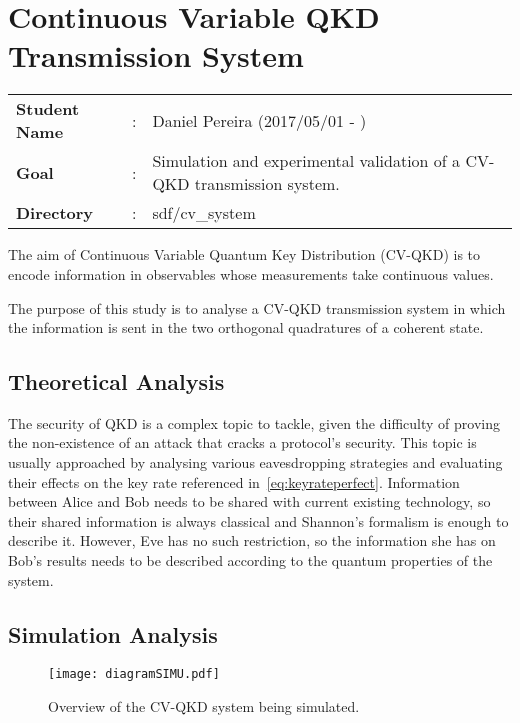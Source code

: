 \clearpage
\section{Continuous Variable QKD Transmission System}\label{sec:intro}

\begin{tcolorbox}	
\begin{tabular}{p{2.75cm} p{0.2cm} p{10.5cm}} 	
\textbf{Student Name}  &:& Daniel Pereira (2017/05/01 - )\\
\textbf{Goal}          &:& Simulation and experimental validation of a CV-QKD transmission system.\\
\textbf{Directory}              &:& sdf/cv\_system  
\end{tabular}
\end{tcolorbox}

The aim of Continuous Variable Quantum Key Distribution (CV-QKD) is to encode information in observables whose measurements take continuous values.
\par
The purpose of this study is to analyse a CV-QKD transmission system in which the information is sent in the two orthogonal quadratures of a coherent state. 

\subsection{Theoretical Analysis}

The security of QKD is a complex topic to tackle, given the difficulty of proving the non-existence of an attack that cracks a protocol's security. This topic is usually approached by analysing various eavesdropping strategies and evaluating their effects on the key rate referenced in~\eqref{eq:keyrateperfect}. Information between Alice and Bob needs to be shared with current existing technology, so their shared information is always classical and Shannon's formalism is enough to describe it. However, Eve has no such restriction, so the information she has on Bob's results needs to be described according to the quantum properties of the system. 

\subsection{Simulation Analysis}

\begin{figure}[h]
\centering
\texttt{[image: diagramSIMU.pdf]}
\caption{Overview of the CV-QKD system being simulated.}
\label{fig:CV-System}
\end{figure}

